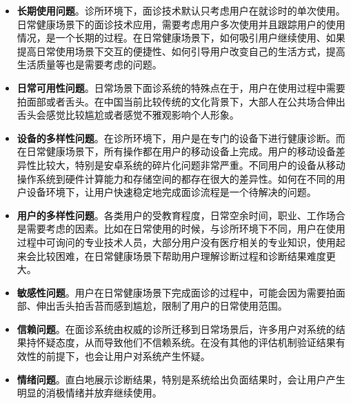 \begin{itemize}
    
    \item \textbf{长期使用问题}。诊所环境下，面诊技术默认只考虑用户在就诊时的单次使用。日常健康场景下的面诊技术应用，需要考虑用户多次使用并且跟踪用户的使用情况，是一个长期的过程。在日常健康场景下，如何吸引用户继续使用、如果提高日常使用场景下交互的便捷性、如何引导用户改变自己的生活方式，提高生活质量等也是需要考虑的问题。
    
    \item \textbf{日常可用性问题}。日常场景下面诊系统的特殊点在于，用户在使用过程中需要拍面部或者舌头。在中国当前比较传统的文化背景下，大部人在公共场合伸出舌头会感觉比较尴尬或者感觉不雅观影响个人形象。

    \item \textbf{设备的多样性问题}。在诊所环境下，用户是在专门的设备下进行健康诊断。而在日常健康场景下，所有操作都在用户的移动设备上完成。用户的移动设备差异性比较大，特别是安卓系统的碎片化问题非常严重。不同用户的设备从移动操作系统到硬件计算能力和存储空间的都存在很大的差异性。如何在不同的用户设备环境下，让用户快速稳定地完成面诊流程是一个待解决的问题。
    
    \item \textbf{用户的多样性问题}。各类用户的受教育程度，日常空余时间，职业、工作场合是需要考虑的因素。比如在日常使用的时候，与诊所环境下不同，用户在使用过程中可询问的专业技术人员，大部分用户没有医疗相关的专业知识，使用起来会比较困难，在日常健康场景下帮助用户理解诊断过程和诊断结果难度更大。
    
    \item \textbf{敏感性问题}。用户在日常健康场景下完成面诊的过程中，可能会因为需要拍面部、伸出舌头拍舌苔而感到尴尬，限制了用户的日常使用范围。
    
    \item \textbf{信赖问题}。在面诊系统由权威的诊所迁移到日常场景后，许多用户对系统的结果持怀疑态度，从而导致他们不信赖系统。在没有其他的评估机制验证结果有效性的前提下，也会让用户对系统产生怀疑。
    
    \item \textbf{情绪问题}。直白地展示诊断结果，特别是系统给出负面结果时，会让用户产生明显的消极情绪并放弃继续使用。 

\end{itemize}

